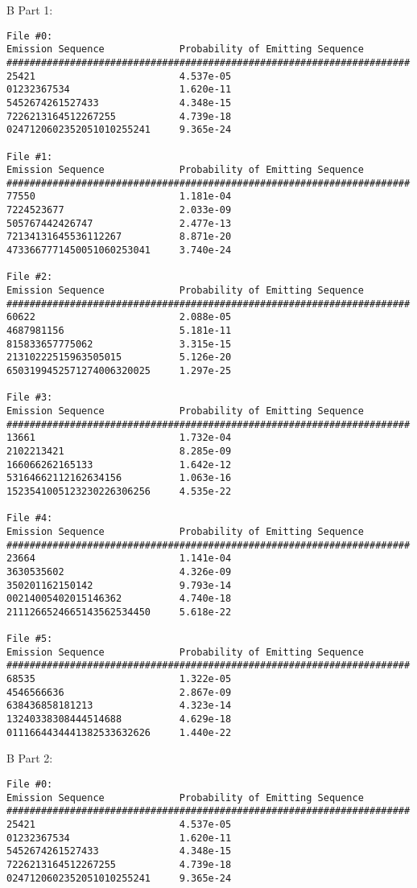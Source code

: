 \begin{solution}
B Part 1:
\begin{verbatim}
File #0:
Emission Sequence             Probability of Emitting Sequence
######################################################################
25421                         4.537e-05 
01232367534                   1.620e-11 
5452674261527433              4.348e-15 
7226213164512267255           4.739e-18 
0247120602352051010255241     9.365e-24 

File #1:
Emission Sequence             Probability of Emitting Sequence
######################################################################
77550                         1.181e-04 
7224523677                    2.033e-09 
505767442426747               2.477e-13 
72134131645536112267          8.871e-20 
4733667771450051060253041     3.740e-24 

File #2:
Emission Sequence             Probability of Emitting Sequence
######################################################################
60622                         2.088e-05 
4687981156                    5.181e-11 
815833657775062               3.315e-15 
21310222515963505015          5.126e-20 
6503199452571274006320025     1.297e-25 

File #3:
Emission Sequence             Probability of Emitting Sequence
######################################################################
13661                         1.732e-04 
2102213421                    8.285e-09 
166066262165133               1.642e-12 
53164662112162634156          1.063e-16 
1523541005123230226306256     4.535e-22 

File #4:
Emission Sequence             Probability of Emitting Sequence
######################################################################
23664                         1.141e-04 
3630535602                    4.326e-09 
350201162150142               9.793e-14 
00214005402015146362          4.740e-18 
2111266524665143562534450     5.618e-22 

File #5:
Emission Sequence             Probability of Emitting Sequence
######################################################################
68535                         1.322e-05 
4546566636                    2.867e-09 
638436858181213               4.323e-14 
13240338308444514688          4.629e-18 
0111664434441382533632626     1.440e-22 
\end{verbatim}
B Part 2:
\begin{verbatim}
File #0:
Emission Sequence             Probability of Emitting Sequence
######################################################################
25421                         4.537e-05 
01232367534                   1.620e-11 
5452674261527433              4.348e-15 
7226213164512267255           4.739e-18 
0247120602352051010255241     9.365e-24 


\end{verbatim}
\end{solution}
